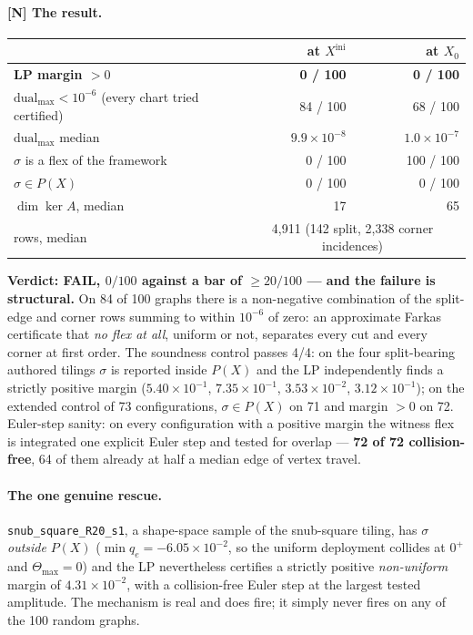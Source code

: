 \documentclass[11pt,a4paper]{article}
\theoremstyle{definition}
\newcommand{\Tmax}{\Theta_{\max}}
\newcommand{\file}[1]{\texttt{\small #1}}
\begin{document}
\paragraph{[N] The result.}
\begin{center}
\small
\begin{tabular}{@{}lrr@{}}
\toprule
 & at $X^{\mathrm{ini}}$ & at $X_0$ \\
\midrule
\textbf{LP margin $>0$} & \textbf{0 / 100} & \textbf{0 / 100} \\
$\mathrm{dual}_{\max}<10^{-6}$ (every chart tried certified) & 84 / 100 & 68 / 100 \\
$\mathrm{dual}_{\max}$ median & $9.9\times10^{-8}$ & $1.0\times10^{-7}$ \\
$\sigma$ is a flex of the framework & 0 / 100 & 100 / 100 \\
$\sigma\in P(X)$ & 0 / 100 & 0 / 100 \\
$\dim\ker A$, median & 17 & 65 \\
rows, median & \multicolumn{2}{c}{4{,}911 (142 split, 2{,}338 corner incidences)} \\
\bottomrule
\end{tabular}
\end{center}

\noindent \textbf{Verdict: FAIL, $0/100$ against a bar of $\ge20/100$ --- and the failure is
structural.} On 84 of 100 graphs there is a non-negative combination of the split-edge and
corner rows summing to within $10^{-6}$ of zero: an approximate Farkas certificate that
\emph{no flex at all}, uniform or not, separates every cut and every corner at first order.
The soundness control passes 4/4: on the four split-bearing authored tilings $\sigma$ is
reported inside $P(X)$ and the LP independently finds a strictly positive margin
($5.40\times10^{-1}$, $7.35\times10^{-1}$, $3.53\times10^{-2}$, $3.12\times10^{-1}$); on the
extended control of 73 configurations, $\sigma\in P(X)$ on 71 and margin $>0$ on 72.
Euler-step sanity: on every configuration with a positive margin the witness flex is
integrated one explicit Euler step and tested for overlap --- \textbf{72 of 72 collision-free},
64 of them already at half a median edge of vertex travel.

\paragraph{The one genuine rescue.} \file{snub\_square\_R20\_s1}, a shape-space sample of the
snub-square tiling, has $\sigma$ \emph{outside} $P(X)$ ($\min q_e=-6.05\times10^{-2}$, so the
uniform deployment collides at $0^+$ and $\Tmax=0$) and the LP nevertheless certifies a
strictly positive \emph{non-uniform} margin of $4.31\times10^{-2}$, with a collision-free
Euler step at the largest tested amplitude. The mechanism is real and does fire; it simply
never fires on any of the 100 random graphs.
\end{document}
